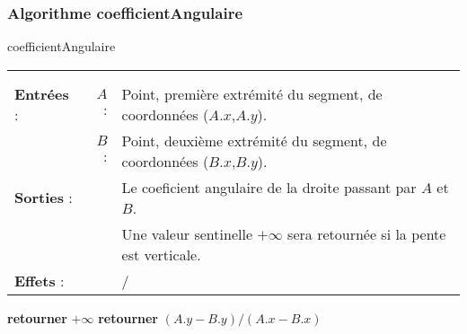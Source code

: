 \documentclass[10pt]{article}
\begin{document}
\subsubsection{Algorithme coefficientAngulaire}
\begin{algorithm}[H]
\caption{coefficientAngulaire}
\begin{tabular}{lrl}
\multicolumn{3}{l}{\makecell[l]{Calcule le coefficient angulaire d'un segment. Renvoie la valeur sentinelle $+\infty$ si le segment est vertical.}}\\
&&\\
\textbf{Entrées} : &$A$ : &Point, première extrémité du segment, de coordonnées ($A.x$,$A.y$).\\
&$B$ :&Point, deuxième extrémité du segment, de coordonnées ($B.x$,$B.y$).\\[.25cm]
\textbf{Sorties} :& &Le coeficient angulaire de la droite passant par $A$ et $B$.\\
& &Une valeur sentinelle $+\infty$ sera retournée si la pente est verticale.\\[.25cm]
\textbf{Effets} :& &/\\[.25cm]
\end{tabular}
\begin{algorithmic}[1]
\State \textbf{retourner} $+\infty$
\Else
\State \textbf{retourner} $(A.y-B.y)/(A.x-B.x)$
\EndIf
\EndProcedure
\end{algorithmic}
\end{algorithm}
\end{document}
